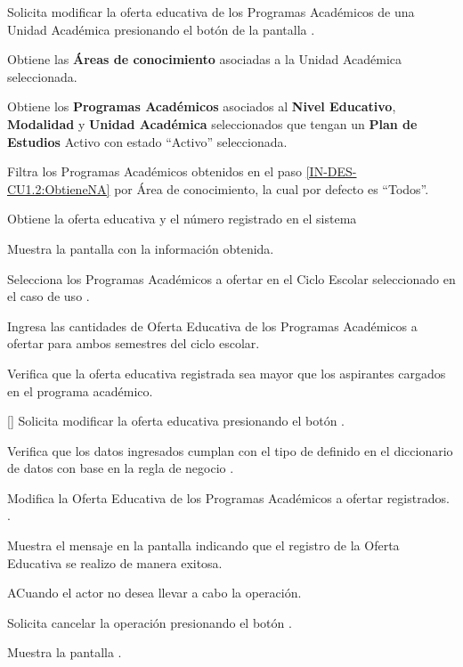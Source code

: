 \begin{UCtrayectoria}

	\UCpaso [\UCactor] Solicita modificar la oferta educativa de los Programas Académicos de una Unidad Académica presionando el botón  de la pantalla .

	\UCpaso Obtiene las \textbf{Áreas de conocimiento} asociadas a la Unidad Académica seleccionada. 

	\UCpaso \label{IN-DES-CU1.2:ObtieneNA} Obtiene los \textbf{Programas Académicos} asociados al \textbf{Nivel Educativo}, {\bf Modalidad} y \textbf{Unidad Académica} seleccionados que tengan un {\bf Plan de Estudios} Activo con estado ``Activo'' seleccionada. 

	\UCpaso Filtra los Programas Académicos obtenidos en el paso \ref{IN-DES-CU1.2:ObtieneNA} por Área de conocimiento, la cual por defecto es ``Todos''.
	
	\UCpaso Obtiene la oferta educativa y el número registrado en el sistema

	\UCpaso Muestra la pantalla  con la información obtenida.

	\UCpaso [\UCactor] Selecciona los Programas Académicos a ofertar en el Ciclo Escolar seleccionado en el caso de uso .

	\UCpaso [\UCactor] Ingresa las cantidades de Oferta Educativa de los Programas Académicos a ofertar para ambos semestres del ciclo escolar.
	
	\UCpaso Verifica que la oferta educativa registrada sea mayor que los aspirantes cargados en el programa académico. 
	
	\UCpaso \label{IN-DES-CU1.2:Modificar} [\UCactor] \label{IN-DES-CU1.2:Registrar} Solicita modificar la oferta educativa presionando el botón . 

	\UCpaso Verifica que los datos ingresados cumplan con el tipo de definido en el diccionario de datos con base en la regla de negocio . 

	\UCpaso Modifica la Oferta Educativa de los Programas Académicos a ofertar registrados. .

	\UCpaso Muestra el mensaje  en la pantalla  indicando que el registro de la Oferta Educativa se realizo de manera exitosa.
	
\end{UCtrayectoria}


\begin{UCtrayectoriaA}{A}{Cuando el actor no desea llevar a cabo la operación.}

	\UCpaso [\UCactor] Solicita cancelar la operación presionando el botón .

	\UCpaso Muestra la pantalla .

\end{UCtrayectoriaA}
